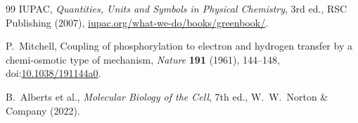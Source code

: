\begin{thebibliography}{99}
IUPAC,
\newblock \emph{Quantities, Units and Symbols in Physical Chemistry}, 3rd ed.,
\newblock RSC Publishing (2007),
\newblock \href{https://iupac.org/what-we-do/books/greenbook/}{iupac.org/what-we-do/books/greenbook/}.

P.~Mitchell,
\newblock Coupling of phosphorylation to electron and hydrogen transfer
by a chemi-osmotic type of mechanism,
\newblock \emph{Nature} \textbf{191} (1961), 144--148,
\newblock doi:\href{https://doi.org/10.1038/191144a0}{10.1038/191144a0}.

B.~Alberts et al.,
\newblock \emph{Molecular Biology of the Cell}, 7th ed.,
\newblock W.~W.~Norton \& Company (2022).

\end{thebibliography}
